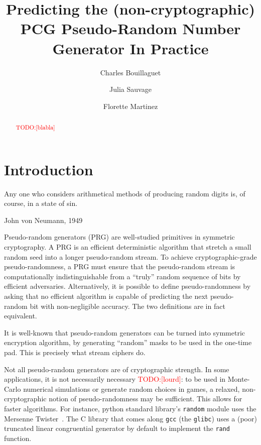 \documentclass[submission,svgnames,journal=tosc]{iacrtrans}
\title[Predicting the PCG Pseudo-Random Number Generator in Practice]{Predicting the (non-cryptographic) PCG Pseudo-Random Number Generator In Practice}
\author{Charles Bouillaguet\inst{1} \and Julia Sauvage\inst{2} \and Florette Martinez\inst{3}}
\institute{%
University of Lille, France \\ 
\email{charles.bouillaguet@univ-lille.fr}
\and 
Sorbonne University \\
\email{julia.sauvage@etu.upmc.fr}
\and 
LIP6, CNRS, SU ? \\
\email{florette.martinez@lip6.fr}

}
\newcommand{\todo}[1]{\textcolor{red}{TODO:[#1]}}
\begin{document}
\maketitle

\keywords{\todo{keyword}}

\begin{abstract}
  \todo{blabla}
\end{abstract}

\section{Introduction} %

\epigraph{Any one who considers arithmetical methods of producing random digits is, of course, in a state of sin.}{John von Neumann, 1949}


Pseudo-random generators (PRG) are well-studied primitives in symmetric
cryptography. A PRG is an efficient deterministic algorithm that stretch a small
random seed into a longer pseudo-random stream. To achieve cryptographic-grade
pseudo-randomness, a PRG must ensure that the pseudo-random stream is
computationally indistinguishable from a ``truly'' random sequence of bits by
efficient adversaries. Alternatively, it is possible to define pseudo-randomness
by asking that no efficient algorithm is capable of predicting the next
pseudo-random bit with non-negligible accuracy. The two definitions are in fact
equivalent.

It is well-known that pseudo-random generators can be turned into symmetric
encryption algorithm, by generating ``random'' masks to be used in the one-time
pad. This is precisely what stream ciphers do.

Not all pseudo-random generators are of cryptographic strength. In some
applications, it is not necessarily necessary \todo{lourd}: to be used in Monte-Carlo
numerical simulations or generate random choices in games, a relaxed,
non-cryptographic notion of pseudo-randomness may be sufficient. This allows for
faster algorithms. For instance, \textsf{python} standard library's
\texttt{random} module uses the Mersenne Twister~\cite{MatsumotoN98}. The
\textsf{C} library that comes along \texttt{gcc} (the \texttt{glibc}) uses a
(poor) truncated linear congruential generator by default to implement the
\texttt{rand} function.
\end{document}
